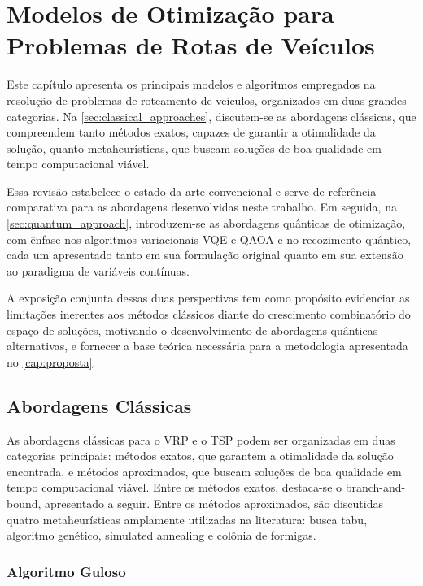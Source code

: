 
\chapter{Modelos de Otimização para Problemas de Rotas de Veículos}

Este capítulo apresenta os principais modelos e algoritmos empregados na resolução de problemas de roteamento de veículos, organizados em duas grandes categorias. Na \autoref{sec:classical_approaches}, discutem-se as abordagens clássicas, que compreendem tanto métodos exatos, capazes de garantir a otimalidade da solução, quanto metaheurísticas, que buscam soluções de boa qualidade em tempo computacional viável. 

Essa revisão estabelece o estado da arte convencional e serve de referência comparativa para as abordagens desenvolvidas neste trabalho. Em seguida, na \autoref{sec:quantum_approach}, introduzem-se as abordagens quânticas de otimização, com ênfase nos algoritmos variacionais VQE e QAOA e no recozimento quântico, cada um apresentado tanto em sua formulação original quanto em sua extensão ao paradigma de variáveis contínuas. 

A exposição conjunta dessas duas perspectivas tem como propósito evidenciar as limitações inerentes aos métodos clássicos diante do crescimento combinatório do espaço de soluções, motivando o desenvolvimento de abordagens quânticas alternativas, e fornecer a base teórica necessária para a metodologia apresentada no \autoref{cap:proposta}.

\section{Abordagens Clássicas}\label{sec:classical_approaches}

As abordagens clássicas para o VRP e o TSP podem ser organizadas em duas categorias principais: métodos exatos, que garantem a otimalidade da solução encontrada, e métodos aproximados, que buscam soluções de boa qualidade em tempo computacional viável. Entre os métodos exatos, destaca-se o branch-and-bound, apresentado a seguir. Entre os métodos aproximados, são discutidas quatro metaheurísticas amplamente utilizadas na literatura: busca tabu, algoritmo genético, simulated annealing e colônia de formigas.

\subsection{Algoritmo Guloso}

